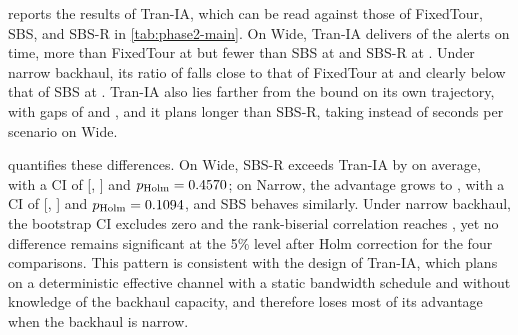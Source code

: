 \label{sec:results-literature}


 reports the results of Tran-IA, which can be read against those of FixedTour, SBS, and SBS-R in \cref{tab:phase2-main}. On Wide, Tran-IA delivers \ResultExtTimelyVzeroTRAN{} of the alerts on time, more than FixedTour at \ResultExtTimelyVzeroBone{} but fewer than SBS at \ResultExtTimelyVzeroBtwo{} and SBS-R at \ResultExtTimelyVzeroP. Under narrow backhaul, its ratio of \ResultExtTimelyVzeroBhfivezeroTRAN{} falls close to that of FixedTour at \ResultExtTimelyVzeroBhfivezeroBone{} and clearly below that of SBS at \ResultExtTimelyVzeroBhfivezeroBtwo. Tran-IA also lies farther from the bound on its own trajectory, with gaps of \ResultExtGapVzeroTRAN{} and \ResultExtGapVzeroBhfivezeroTRAN, and it plans longer than SBS-R, taking \ResultExtPlanningVzeroTRAN{} instead of \ResultExtPlanningVzeroP{} seconds per scenario on Wide.



 quantifies these differences. On Wide, SBS-R exceeds Tran-IA by \ResultExtDiffVzeroPTran{} on average, with a CI of [\ResultExtDiffLowVzeroPTran, \ResultExtDiffHighVzeroPTran] and $p_{\mathrm{Holm}}=\num{0.4570}$; on Narrow, the advantage grows to \ResultExtDiffVzeroBhfivezeroPTran, with a CI of [\ResultExtDiffLowVzeroBhfivezeroPTran, \ResultExtDiffHighVzeroBhfivezeroPTran] and $p_{\mathrm{Holm}}=\num{0.1094}$, and SBS behaves similarly. Under narrow backhaul, the bootstrap CI excludes zero and the rank-biserial correlation reaches \ResultExtRankBiserialVzeroBhfivezeroPTran, yet no difference remains significant at the 5\% level after Holm correction for the four comparisons. This pattern is consistent with the design of Tran-IA, which plans on a deterministic effective channel with a static bandwidth schedule and without knowledge of the backhaul capacity, and therefore loses most of its advantage when the backhaul is narrow.

